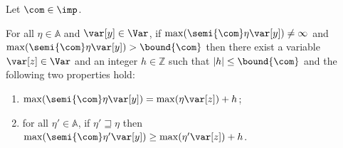 \begin{lemma}
  \label{le:inc}
  Let \(\com\in \imp\). %
  
  \noindent
  For all \(\eta \in \mathbb{A}\) and \(\var[y] \in \Var\), if
  \(\max(\semi{\com} \eta \var[y]) \neq \infty\) and
  \(\max(\semi{\com}\eta \var[y]) > \bound{\com}\) then there exist a
  variable \(\var[z] \in \Var\) and an integer \(h \in \mathbb{Z}\)
  such that \(|h| \leq \bound{\com}\) and the following two properties
  hold:
  \begin{enumerate}[label=(\roman*)]
  \item \(\max(\semi{\com}\eta \var[y]) = \max(\eta \var[z]) + h\); \label{point1}
  \item  for all \(\eta' \in \mathbb{A}\), if \(\eta' \sqsupseteq \eta\)
    then
    \(\max(\semi{\com}\eta' \var[y]) \geq \max(\eta' \var[z]) + h\). \label{point2}
  \end{enumerate}
\end{lemma}

